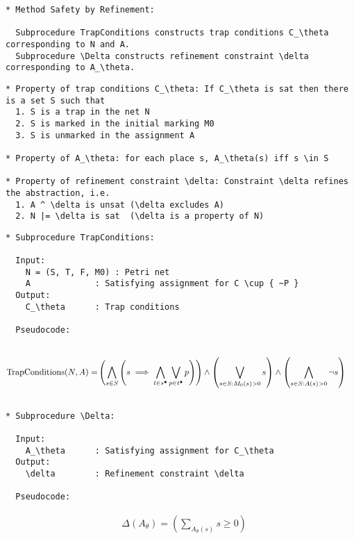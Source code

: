 \begin{verbatim}
* Method Safety by Refinement:

  Subprocedure TrapConditions constructs trap conditions C_\theta corresponding to N and A.
  Subprocedure \Delta constructs refinement constraint \delta corresponding to A_\theta.
\end{verbatim}





\begin{verbatim}
* Property of trap conditions C_\theta: If C_\theta is sat then there is a set S such that
  1. S is a trap in the net N
  2. S is marked in the initial marking M0
  3. S is unmarked in the assignment A

* Property of A_\theta: for each place s, A_\theta(s) iff s \in S

* Property of refinement constraint \delta: Constraint \delta refines the abstraction, i.e.
  1. A ^ \delta is unsat (\delta excludes A)
  2. N |= \delta is sat  (\delta is a property of N)
\end{verbatim}

\newpage

\begin{verbatim}
* Subprocedure TrapConditions:

  Input:
    N = (S, T, F, M0) : Petri net
    A             : Satisfying assignment for C \cup { ~P }
  Output:
    C_\theta      : Trap conditions

  Pseudocode:
  
\end{verbatim}
\begin{align*}
  \text{TrapConditions}(N, A) =& \left(
      \bigwedge_{s \in S} \left( s \implies
      \bigwedge_{t \in s^{\bullet}} \bigvee_{p \in t^{\bullet}} p
    \right) \right) \land
    \left( \bigvee_{s \in S: M_0(s) > 0} s \right) \land
    \left( \bigwedge_{s \in S: A(s) > 0} \neg s \right)
\end{align*}
\begin{verbatim}

* Subprocedure \Delta:

  Input:
    A_\theta      : Satisfying assignment for C_\theta
  Output:
    \delta        : Refinement constraint \delta

  Pseudocode:

\end{verbatim}
\begin{align*}
  & \Delta(A_\theta) = \left( \sum_{A_\theta(s)} s \ge 0 \right)
\end{align*}

